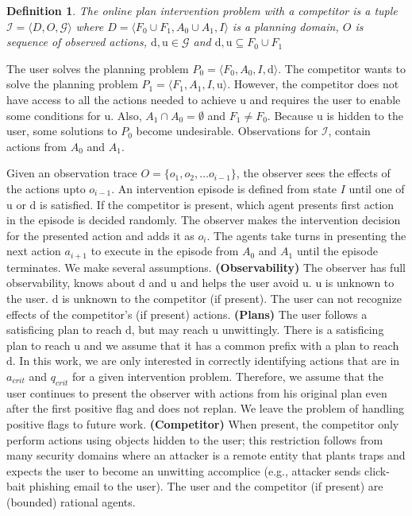 \documentclass[doctor]{thesis} %
\theoremstyle{plain}
\newtheorem{definition}{Definition}
\begin{document}
\begin{definition}
The \textnormal{online plan intervention problem} with a competitor is a tuple $\mathcal{I} = \langle D, O, \mathcal{G} \rangle$ where $D=\langle F_0\cup F_1, A_0\cup A_1, I \rangle$ is a planning domain, 
$O$ is  sequence of observed actions, $\mathrm{d},\mathrm{u} \in \mathcal{G}$ and 
$\mathrm{d}, \mathrm{u} \subseteq F_0\cup F_1$
\end{definition}
The user solves the planning problem $P_0=\langle F_0, A_0, I,\mathrm{d}\rangle$.
The competitor wants to solve the planning problem $P_1=\langle F_1, A_1, I,\mathrm{u}\rangle$.
However, the competitor does not have access to all the actions needed to achieve $\mathrm{u}$ and requires the user to enable some conditions for $\mathrm{u}$. Also, $A_1 \cap A_0=\emptyset$ and $F_1 \neq F_0$. Because $\mathrm{u}$ is hidden to the user, some solutions to $P_0$ become undesirable.
Observations for $\mathcal{I}$, contain actions from $A_0$ and $A_1$.
 

Given an observation trace $O = \lbrace o_1, o_2,\ldots o_{i-1}\rbrace$, the observer sees the effects of the actions upto $o_{i-1}$. An intervention episode is defined from state $I$ until one of $\mathrm{u}$ or $\mathrm{d}$ is satisfied. If the competitor is present, which agent presents first action in the episode is decided randomly. The observer makes the intervention decision for the presented action and adds it as $o_{i}$. The agents take turns in presenting the next action $a_{i+1}$ to execute in the episode from $A_0$ and $A_1$ until the episode terminates.
We make several assumptions.
\textbf{(Observability)} 
The observer has full observability, knows about  $\mathrm{d}$ and $\mathrm{u}$ and helps the user avoid $\mathrm{u}$. $\mathrm{u}$ is unknown to the user. $\mathrm{d}$ is unknown to the competitor (if present).
The user can not recognize effects of the competitor's (if present) actions. 
\textbf{(Plans)} 
The user follows a satisficing plan to reach $\mathrm{d}$, but may reach $\mathrm{u}$ unwittingly. 
There is a satisficing plan to reach $\mathrm{u}$ and we assume that it has a common prefix with a plan to reach $\mathrm{d}$. In this work, we are only interested in correctly identifying actions that are in $a_{crit}$ and $q_{crit}$ for a given intervention problem. Therefore, we assume that  the user continues to present the observer with actions from his original plan even after the first positive flag and does not replan. We leave the problem of handling positive flags to future work.
\textbf{(Competitor)}
When present, the competitor only perform actions using objects hidden to the user; this restriction follows from many security domains where an attacker is a remote entity that plants traps and expects the user to become an unwitting accomplice (e.g., attacker sends click-bait phishing email to the user).
The user and the competitor (if present) are (bounded) rational agents.
\end{document}
